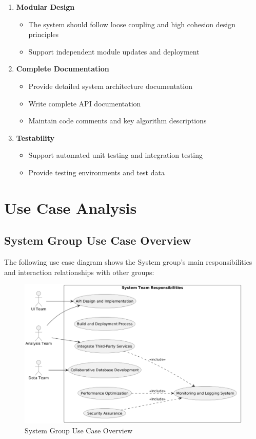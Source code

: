 \documentclass[a4paper,12pt]{article}
\begin{document}
\begin{enumerate}
  \item \textbf{Modular Design}
  \begin{itemize}
    \item The system should follow loose coupling and high cohesion design principles
    \item Support independent module updates and deployment
  \end{itemize}
  
  \item \textbf{Complete Documentation}
  \begin{itemize}
    \item Provide detailed system architecture documentation
    \item Write complete API documentation
    \item Maintain code comments and key algorithm descriptions
  \end{itemize}
  
  \item \textbf{Testability}
  \begin{itemize}
    \item Support automated unit testing and integration testing
    \item Provide testing environments and test data
  \end{itemize}
\end{enumerate}

\section{Use Case Analysis}

\subsection{System Group Use Case Overview}

The following use case diagram shows the System group's main responsibilities and interaction relationships with other groups:

\begin{figure}[H]
    \centering
    \includegraphics[width=0.75\linewidth]{assets/image2_EG.png}
    \caption{System Group Use Case Overview}
    \label{fig:system-overview}
\end{figure}
\end{document}
